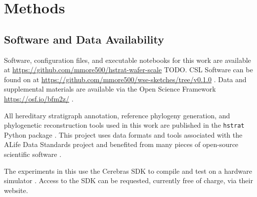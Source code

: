 \section{Methods} \label{sec:methods}










\subsection{Software and Data Availability}

Software, configuration files, and executable notebooks for this work are available at \url{https://github.com/mmore500/hstrat-wafer-scale} TODO.
CSL Software can be found on at \url{https://github.com/mmore500/wse-sketches/tree/v0.1.0} \citep{moreno2024wse}.
Data and supplemental materials are available via the Open Science Framework \url{https://osf.io/bfm2z/} \citep{foster2017open}.

All hereditary stratigraph annotation, reference phylogeny generation, and phylogenetic reconstruction tools used in this work are published in the \texttt{hstrat} Python package \citep{moreno2022hstrat}.
This project uses data formats and tools associated with the ALife Data Standards project \citep{lalejini2019data} and benefited from many pieces of open-source scientific software \citep{sand2014tqdist,2020SciPy-NMeth,harris2020array,reback2020pandas,mckinney-proc-scipy-2010,sukumaran2010dendropy,cock2009biopython,dolson2024phylotrackpy,torchiano2016effsize,waskom2021seaborn,hunter2007matplotlib,moreno2024apc,moreno2023teeplot,torchiano2016effsize,moreno2024pecking,moreno2024joinem,moreno2024hsurf}.

The experiments in this use the Cerebras SDK to compile and test on a hardware simulator \citep{TODOCITE}.
Access to the SDK can be requested, currently free of charge, via their website.
